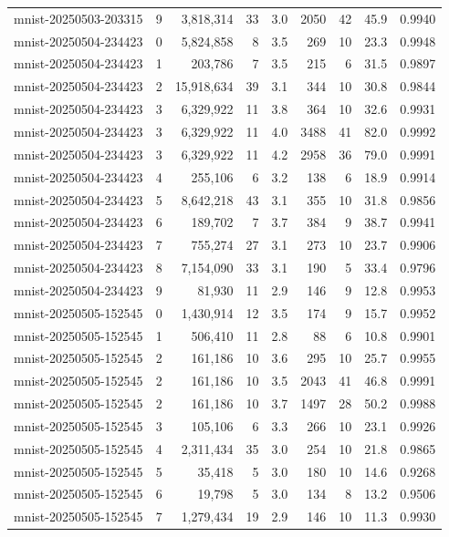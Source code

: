 \begin{tabular}{llrrrrrrr}
mnist-20250503-203315 & 9 & 3,818,314 & 33 & 3.0 & 2050 & 42 & 45.9 & 0.9940 \\
mnist-20250504-234423 & 0 & 5,824,858 & 8 & 3.5 & 269 & 10 & 23.3 & 0.9948 \\
mnist-20250504-234423 & 1 & 203,786 & 7 & 3.5 & 215 & 6 & 31.5 & 0.9897 \\
mnist-20250504-234423 & 2 & 15,918,634 & 39 & 3.1 & 344 & 10 & 30.8 & 0.9844 \\
mnist-20250504-234423 & 3 & 6,329,922 & 11 & 3.8 & 364 & 10 & 32.6 & 0.9931 \\
mnist-20250504-234423 & 3 & 6,329,922 & 11 & 4.0 & 3488 & 41 & 82.0 & 0.9992 \\
mnist-20250504-234423 & 3 & 6,329,922 & 11 & 4.2 & 2958 & 36 & 79.0 & 0.9991 \\
mnist-20250504-234423 & 4 & 255,106 & 6 & 3.2 & 138 & 6 & 18.9 & 0.9914 \\
mnist-20250504-234423 & 5 & 8,642,218 & 43 & 3.1 & 355 & 10 & 31.8 & 0.9856 \\
mnist-20250504-234423 & 6 & 189,702 & 7 & 3.7 & 384 & 9 & 38.7 & 0.9941 \\
mnist-20250504-234423 & 7 & 755,274 & 27 & 3.1 & 273 & 10 & 23.7 & 0.9906 \\
mnist-20250504-234423 & 8 & 7,154,090 & 33 & 3.1 & 190 & 5 & 33.4 & 0.9796 \\
mnist-20250504-234423 & 9 & 81,930 & 11 & 2.9 & 146 & 9 & 12.8 & 0.9953 \\
mnist-20250505-152545 & 0 & 1,430,914 & 12 & 3.5 & 174 & 9 & 15.7 & 0.9952 \\
mnist-20250505-152545 & 1 & 506,410 & 11 & 2.8 & 88 & 6 & 10.8 & 0.9901 \\
mnist-20250505-152545 & 2 & 161,186 & 10 & 3.6 & 295 & 10 & 25.7 & 0.9955 \\
mnist-20250505-152545 & 2 & 161,186 & 10 & 3.5 & 2043 & 41 & 46.8 & 0.9991 \\
mnist-20250505-152545 & 2 & 161,186 & 10 & 3.7 & 1497 & 28 & 50.2 & 0.9988 \\
mnist-20250505-152545 & 3 & 105,106 & 6 & 3.3 & 266 & 10 & 23.1 & 0.9926 \\
mnist-20250505-152545 & 4 & 2,311,434 & 35 & 3.0 & 254 & 10 & 21.8 & 0.9865 \\
mnist-20250505-152545 & 5 & 35,418 & 5 & 3.0 & 180 & 10 & 14.6 & 0.9268 \\
mnist-20250505-152545 & 6 & 19,798 & 5 & 3.0 & 134 & 8 & 13.2 & 0.9506 \\
mnist-20250505-152545 & 7 & 1,279,434 & 19 & 2.9 & 146 & 10 & 11.3 & 0.9930 \\

\end{tabular}

